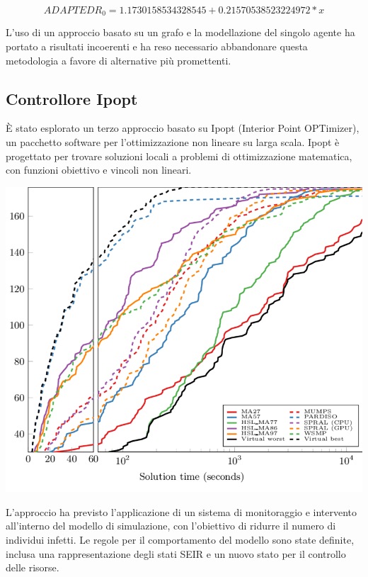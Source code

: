 $$ ADAPTED R_0 = 1.1730158534328545 + 0.21570538523224972 * x $$

L'uso di un approccio basato su un grafo e la modellazione del 
singolo agente ha portato a risultati incoerenti e ha reso necessario 
abbandonare questa metodologia a favore di alternative più promettenti.
\newpage

\subsection{Controllore Ipopt}

È stato esplorato un terzo approccio basato su Ipopt 
(Interior Point OPTimizer), un pacchetto software per l'ottimizzazione 
non lineare su larga scala. Ipopt è progettato per trovare soluzioni 
locali a problemi di ottimizzazione matematica, con funzioni obiettivo e 
vincoli non lineari. \cite{Wächter2006}

\begin{minipage}{\linewidth}
    \centering
    \includegraphics[width=\textwidth]{img/Comparison-of-Ipopt-performance-over-various-linear-solvers-using-the-two-dimensional.png}
    \label{fig:Ipopt_solver}
\end{minipage}

L'approccio ha previsto l'applicazione di un sistema di 
monitoraggio e intervento all'interno del modello di simulazione, 
con l'obiettivo di ridurre il numero di individui infetti. 
Le regole per il comportamento del modello sono state definite, 
inclusa una rappresentazione degli stati SEIR e un nuovo stato per 
il controllo delle risorse.

